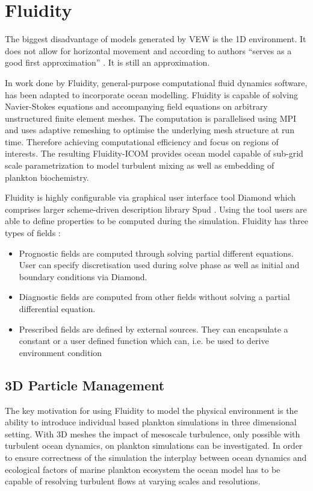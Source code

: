 \documentclass[12pt, a4paper]{report}
\begin{document}
\section{Fluidity}\label{sec:fluidity}
The biggest disadvantage of models generated by VEW is the 1D environment.
It does not allow for horizontal movement and according to authors
``serves as a good first approximation'' \cite{Woods2005}. It is still an approximation.

In work done by \cite{FluidityVEW} Fluidity, general-purpose
computational fluid dynamics software, has been adapted to incorporate
ocean modelling. Fluidity \cite{Piggot2008,fluidity} is capable of
solving Navier-Stokes equations and accompanying field equations on
arbitrary unstructured finite element meshes. The computation is
parallelised using MPI and uses adaptive remeshing to optimise the
underlying mesh structure at run time. Therefore achieving computational
efficiency and focus on regions of interests. The resulting Fluidity-ICOM
provides ocean model capable of sub-grid scale parametrization to model
turbulent mixing as well as embedding of plankton biochemistry.

Fluidity is highly configurable via graphical user interface tool Diamond
which comprises larger scheme-driven description library Spud \cite{ham2009spud}.
Using the tool users are able to define properties to be computed during the simulation.
Fluidity has three types of fields \cite{fluidity}:

\begin{itemize}
  \item Prognostic fields are computed through solving partial different equations.
    User can specify discretisation used during solve phase as well as initial and boundary
    conditions via Diamond.
  \item Diagnostic fields are computed from other fields without solving a
    partial differential equation.
  \item Prescribed fields are defined by external sources. They can encapsulate a constant
    or a user defined function which can, i.e. be used to derive environment condition
\end{itemize}

\subsection{3D Particle Management}\label{subsec:3d-pm}
The key motivation for using Fluidity to model the physical environment
is the ability to introduce individual based plankton simulations in three
dimensional setting. With 3D meshes the impact of mesoscale turbulence,
only possible with turbulent ocean dynamics, on plankton simulations
can be investigated. In order to ensure correctness of the simulation
the interplay between ocean dynamics and ecological factors of marine
plankton ecosystem the ocean model has to be capable of resolving
turbulent flows at varying scales and resolutions.
\end{document}
